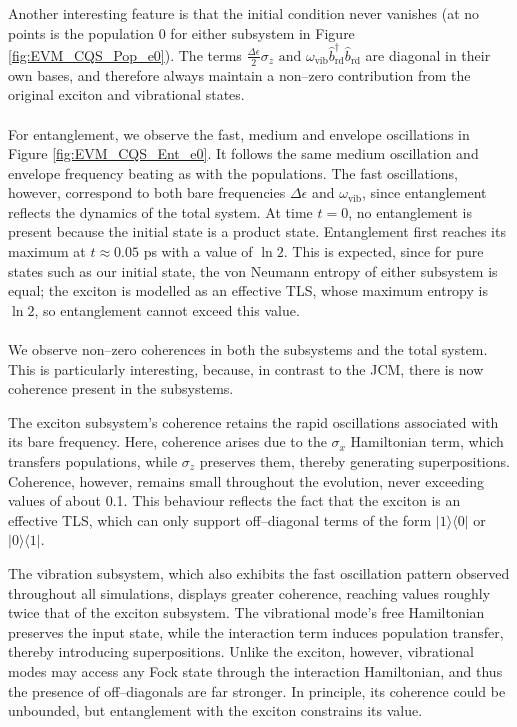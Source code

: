 \documentclass[11pt]{article}
\begin{document}
Another interesting feature is that the initial condition never vanishes (at no points is the population 0 for either subsystem in Figure \ref{fig:EVM_CQS_Pop_e0}). The terms $\frac{\Delta\epsilon}{2}\sigma_z\text{ and } \omega_{\scriptscriptstyle \text{vib}}\hat{b}_{\scriptscriptstyle \text{rd}}^\dagger\hat{b}_{\scriptscriptstyle \text{rd}}$ are diagonal in their own bases, and therefore always maintain a non--zero contribution from the original exciton and vibrational states.\\
\\
For entanglement, we observe the fast, medium and envelope oscillations in Figure \ref{fig:EVM_CQS_Ent_e0}. It follows the same medium oscillation and envelope frequency beating as with the populations. The fast oscillations, however, correspond to both bare frequencies $\Delta\epsilon$ and $\omega_{\scriptscriptstyle \text{vib}}$, since entanglement reflects the dynamics of the total system. At time $t = 0$, no entanglement is present because the initial state is a product state. Entanglement first reaches its maximum at $t \approx 0.05$ ps with a value of $\ln 2$. This is expected, since for pure states such as our initial state, the von Neumann entropy of either subsystem is equal; the exciton is modelled as an effective TLS, whose maximum entropy is $\ln 2$, so entanglement cannot exceed this value.\\
\\
We observe non--zero coherences in both the subsystems and the total system. This is particularly interesting, because, in contrast to the JCM, there is now coherence present in the subsystems. 

The exciton subsystem's coherence retains the rapid oscillations associated with its bare frequency. Here, coherence arises due to the $\sigma_x$ Hamiltonian term, which transfers populations, while $\sigma_z$ preserves them, thereby generating superpositions. Coherence, however, remains small throughout the evolution, never exceeding values of about 0.1. This behaviour reflects the fact that the exciton is an effective TLS, which can only support off--diagonal terms of the form $|1\rangle\langle 0|$ or $|0\rangle\langle 1|$.

The vibration subsystem, which also exhibits the fast oscillation pattern observed throughout all simulations, displays greater coherence, reaching values roughly twice that of the exciton subsystem. The vibrational mode's free Hamiltonian preserves the input state, while the interaction term induces population transfer, thereby introducing superpositions. Unlike the exciton, however, vibrational modes may access any Fock state through the interaction Hamiltonian, and thus the presence of off--diagonals are far stronger. In principle, its coherence could be unbounded, but entanglement with the exciton constrains its value.
\end{document}
